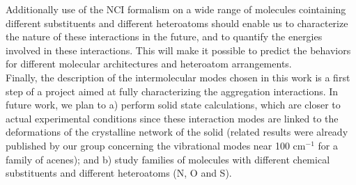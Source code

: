 		Additionally use of the NCI formalism on a wide range of molecules cointaining different substituents and different heteroatoms should enable us to characterize the nature of these interactions in the future, and to quantify the energies involved in these interactions. This will make it possible to predict the behaviors for different molecular architectures and heteroatom arrangements.\\
		
		
		Finally, the description of the intermolecular modes chosen in this work is a first step of a project aimed at fully characterizing the aggregation interactions. In future work, we plan to a) perform solid state calculations, which are closer to actual experimental conditions since these interaction modes are linked to the deformations of the crystalline network of the solid (related results were already published by our group concerning the vibrational modes near 100 cm$^{-1}$ for a family of acenes); and b) study families of molecules with different chemical substituents and different heteroatoms (N, O and S).
		
